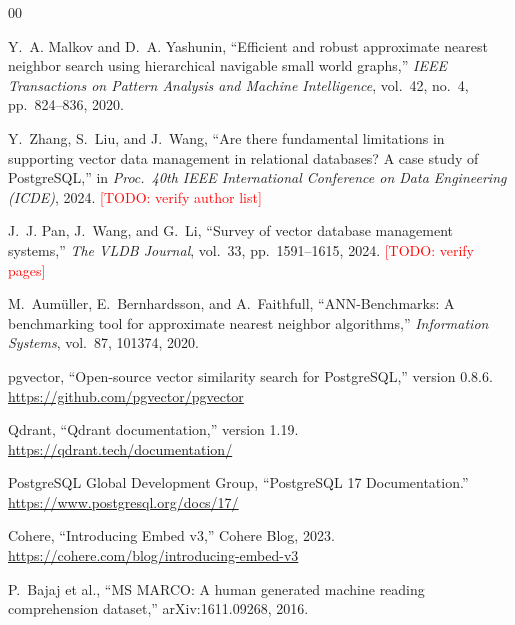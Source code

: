 \documentclass[sigconf, nonacm]{acmart}
\newcommand{\todo}[1]{\textcolor{red}{[TODO: #1]}}
\newcommand{\todo}[1]{\errmessage{Unresolved TODO: #1}}
\begin{document}
\begin{thebibliography}{00}

Y.~A. Malkov and D.~A. Yashunin, ``Efficient and robust approximate nearest
neighbor search using hierarchical navigable small world graphs,''
\textit{IEEE Transactions on Pattern Analysis and Machine Intelligence},
vol.~42, no.~4, pp.~824--836, 2020.

Y.~Zhang, S.~Liu, and J.~Wang, ``Are there fundamental limitations in supporting
vector data management in relational databases? A case study of PostgreSQL,'' in
\textit{Proc.\ 40th IEEE International Conference on Data Engineering (ICDE)}, 2024.
\todo{verify author list}

J.~J. Pan, J.~Wang, and G.~Li, ``Survey of vector database management systems,''
\textit{The VLDB Journal}, vol.~33, pp.~1591--1615, 2024. \todo{verify pages}

M.~Aumüller, E.~Bernhardsson, and A.~Faithfull, ``ANN-Benchmarks: A benchmarking tool
for approximate nearest neighbor algorithms,'' \textit{Information Systems}, vol.~87,
101374, 2020.

pgvector, ``Open-source vector similarity search for PostgreSQL,'' version 0.8.6.
\url{https://github.com/pgvector/pgvector}

Qdrant, ``Qdrant documentation,'' version 1.19. \url{https://qdrant.tech/documentation/}

PostgreSQL Global Development Group, ``PostgreSQL 17 Documentation.''
\url{https://www.postgresql.org/docs/17/}

Cohere, ``Introducing Embed v3,'' Cohere Blog, 2023.
\url{https://cohere.com/blog/introducing-embed-v3}

P.~Bajaj et al., ``MS MARCO: A human generated machine reading comprehension
dataset,'' arXiv:1611.09268, 2016.

\end{thebibliography}
\end{document}
